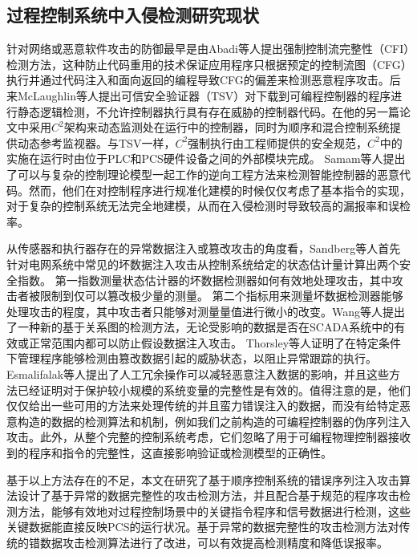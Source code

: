 \subsection{过程控制系统中入侵检测研究现状}

针对网络或恶意软件攻击的防御最早是由Abadi等人提出强制控制流完整性（CFI）检测方法\parencite{Abadi09}，这种防止代码重用的技术保证应用程序只根据预定的控制流图（CFG）执行并通过代码注入和面向返回的编程导致CFG的偏差来检测恶意程序攻击。后来McLaughlin等人提出可信安全验证器（TSV）\parencite {TSV2014}对下载到可编程控制器的程序进行静态逻辑检测，不允许控制器执行具有存在威胁的控制器代码。在他的另一篇论文中采用$C^2$架构\parencite{McLaughlin13}来动态监测处在运行中的控制器，同时为顺序和混合控制系统提供动态参考监视器。与TSV一样，$C^2$强制执行由工程师提供的安全规范，$C^2$中的实施在运行时由位于PLC和PCS硬件设备之间的外部模块完成。 Samam等人提出了可以与复杂的控制理论模型一起工作的逆向工程方法来检测智能控制器的恶意代码\parencite{Zonouz2014}。然而，他们在对控制程序进行规准化建模的时候仅仅考虑了基本指令的实现，对于复杂的控制系统无法完全地建模，从而在入侵检测时导致较高的漏报率和误检率。

从传感器和执行器存在的异常数据注入或篡改攻击的角度看，Sandberg等人首先针对电网系统中常见的坏数据注入攻击从控制系统给定的状态估计量计算出两个安全指数。 第一指数测量状态估计器的坏数据检测器如何有效地处理攻击，其中攻击者被限制到仅可以篡改极少量的测量\parencite{Sandberg10}。 第二个指标用来测量坏数据检测器能够处理攻击的程度，其中攻击者只能够对测量量值进行微小的改变。Wang等人提出了一种新的基于关系图的检测方法，无论受影响的数据是否在SCADA系统中的有效或正常范围内都可以防止假设数据注入攻击\parencite {wang2014}。 Thorsley等人证明了在特定条件下管理程序能够检测由篡改数据引起的威胁状态，以阻止异常跟踪的执行\parencite {Thorsley2014}。 Esmalifalak等人提出了人工冗余操作可以减轻恶意注入数据的影响，并且这些方法已经证明对于保护较小规模的系统变量的完整性是有效的\parencite{liu2014}。值得注意的是，他们仅仅给出一些可用的方法来处理传统的并且蛮力错误注入的数据，而没有给特定恶意构造的数据的检测算法和机制，例如我们之前构造的可编程控制器的伪序列注入攻击。此外，从整个完整的控制系统考虑，它们忽略了用于可编程物理控制器接收到的程序和指令的完整性，这直接影响验证或检测模型的正确性。

基于以上方法存在的不足，本文在研究了基于顺序控制系统的错误序列注入攻击算法设计了基于异常的数据完整性的攻击检测方法，并且配合基于规范的程序攻击检测方法，能够有效地对过程控制场景中的关键指令程序和信号数据进行检测，这些关键数据能直接反映PCS的运行状况。基于异常的数据完整性的攻击检测方法对传统的错数据攻击检测算法进行了改进，可以有效提高检测精度和降低误报率。

